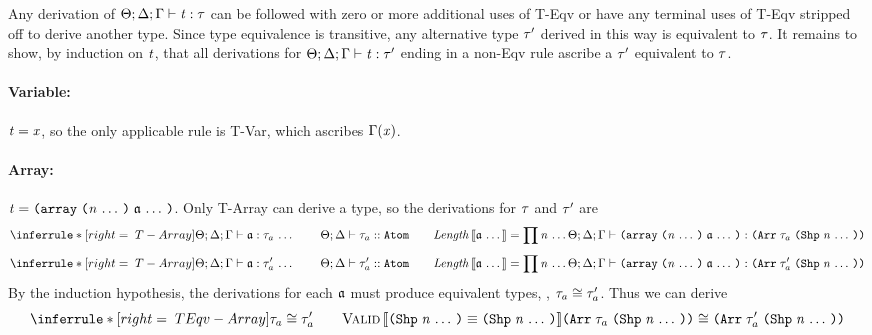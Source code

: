 \begin{sproof}
  Any derivation of $\Theta;\Delta;\Gamma \vdash \mathit{t} : \mathit{\tau}$
  can be followed with zero or more additional uses of {\sc T-Eqv}
  or have any terminal uses of {\sc T-Eqv} stripped off
  to derive another type.
  Since type equivalence is transitive, any alternative type $\mathit{\tau}'$ derived in this way
  is equivalent to $\mathit{\tau}$.
  It remains to show, by induction on $\mathit{t}$,
  that all derivations for $\Theta;\Delta;\Gamma \vdash \mathit{t} : \mathit{\tau}'$ 
  ending in a non-{\sc Eqv} rule
  ascribe a $\mathit{\tau}'$ equivalent to $\mathit{\tau}$.
  \paragraph{Variable:}
  $\mathit{t} = \mathit{x}$,
  so the only applicable rule is {\sc T-Var},
  which ascribes $\Gamma(\mathit{x})$.
  \paragraph{Array:}
  $\term = \arrlit{\sequence{\atom}}{\sequence{\nat}}$.
  Only {\sc T-Array} can derive a type,
  so the derivations for $\mathit{\tau}$ and $\mathit{\tau}'$ are
  \[\infr[T-Array]
  {\sequence{\typeof{\sEnv}{\kEnv}{\tEnv}{\atom}{\type_a}}
    \qquad \kindof{\sEnv}{\kEnv}{\type_a}{\kindatom}
    \qquad \mathit{Length}\llb \sequence{\atom} \rrb = \prod{\sequence{\nat}}}
  {\typeof{\sEnv}{\kEnv}{\tEnv}
    {\arrlit{\sequence{\atom}}{\sequence{\nat}}}
    {\typearray{\type_a}{\idxshape{\sequence{\nat}}}}}\]
  \ctrand
  \[\infr[T-Array]
  {\sequence{\typeof{\sEnv}{\kEnv}{\tEnv}{\atom}{\type_a'}}
    \qquad \kindof{\sEnv}{\kEnv}{\type_a'}{\kindatom}
    \qquad \mathit{Length}\llb \sequence{\atom} \rrb = \prod{\sequence{\nat}}}
  {\typeof{\sEnv}{\kEnv}{\tEnv}
    {\arrlit{\sequence{\atom}}{\sequence{\nat}}}
    {\typearray{\type_a'}{\idxshape{\sequence{\nat}}}}}\]
  By the induction hypothesis,
  the derivations for each $\mathfrak{a}$ must produce equivalent types,
  \ie, $\mathit{\tau}_a \cong \mathit{\tau}_a'$.
  Thus we can derive
  \[\infr[TEqv-Array]
  {\teqv{\type_a}{\type_a'}
    \qquad \ieqv{\idxshape{\sequence{\nat}}}{\idxshape{\sequence{\nat}}}}
  {\teqv
    {\typearray{\type_a}{\idxshape{\sequence{\nat}}}}
    {\typearray{\type_a'}{\idxshape{\sequence{\nat}}}}}\]

\end{sproof}
